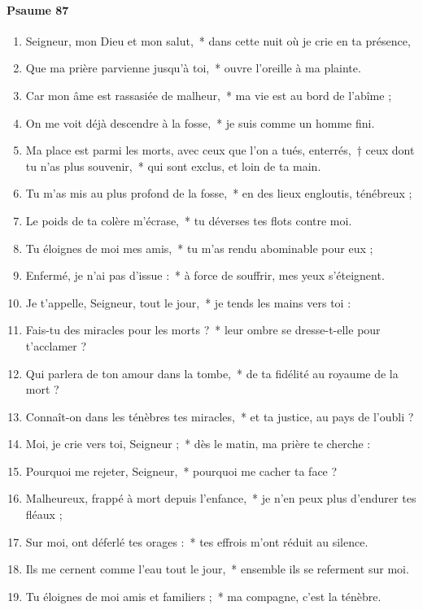 \documentclass[twoside]{article}
\begin{document}
\begin{paracol}[1]{2}
\paragraph{Psaume 87}
\begin{enumerate}[wide, itemsep=0mm, labelwidth=!, labelindent=0pt, label=\color{gregoriocolor}\theenumi]
\item Seigneur, mon Dieu et mon salut,~* dans cette nuit où je crie en ta présence,
\item Que ma prière parvienne jusqu'à toi,~* ouvre l'oreille à ma plainte.
\item Car mon âme est rassasiée de malheur,~* ma vie est au bord de l'abîme ;
\item On me voit déjà descendre à la fosse,~* je suis comme un homme fini.
\item Ma place est parmi les morts, avec ceux que l'on a tués, enterrés,~† ceux dont tu n'as plus souvenir,~* qui sont exclus, et loin de ta main.
\item Tu m'as mis au plus profond de la fosse,~* en des lieux engloutis, ténébreux ;
\item Le poids de ta colère m'écrase,~* tu déverses tes flots contre moi.
\item Tu éloignes de moi mes amis,~* tu m'as rendu abominable pour eux ; 
\item Enfermé, je n'ai pas d'issue :~* à force de souffrir, mes yeux s'éteignent.
\item Je t'appelle, Seigneur, tout le jour,~* je tends les mains vers toi :
\item Fais-tu des miracles pour les morts ?~* leur ombre se dresse-t-elle pour t'acclamer ?
\item Qui parlera de ton amour dans la tombe,~* de ta fidélité au royaume de la mort ?
\item Connaît-on dans les ténèbres tes miracles,~* et ta justice, au pays de l'oubli ?
\item Moi, je crie vers toi, Seigneur ;~* dès le matin, ma prière te cherche :
\item Pourquoi me rejeter, Seigneur,~* pourquoi me cacher ta face ?
\item Malheureux, frappé à mort depuis l'enfance,~* je n'en peux plus d'endurer tes fléaux ;
\item Sur moi, ont déferlé tes orages :~* tes effrois m'ont réduit au silence.
\item Ils me cernent comme l'eau tout le jour,~* ensemble ils se referment sur moi.
\item Tu éloignes de moi amis et familiers ;~* ma compagne, c'est la ténèbre.\capsaut{}
\end{enumerate}
\switchcolumn*


\end{paracol}
\end{document}

